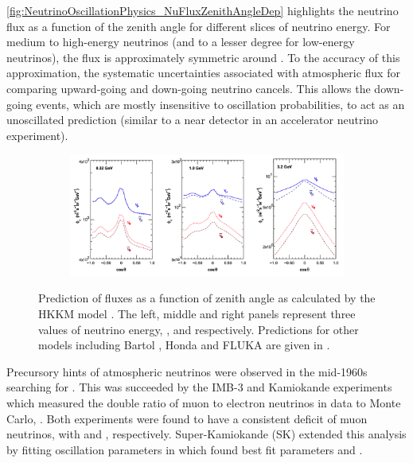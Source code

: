 \autoref{fig:NeutrinoOscillationPhysics_NuFluxZenithAngleDep} highlights the neutrino flux as a function of the zenith angle for different slices of neutrino energy. For medium to high-energy neutrinos (and to a lesser degree for low-energy neutrinos), the flux is approximately symmetric around . To the accuracy of this approximation, the systematic uncertainties associated with atmospheric flux for comparing upward-going and down-going neutrino cancels. This allows the down-going events, which are mostly insensitive to oscillation probabilities, to act as an unoscillated prediction (similar to a near detector in an accelerator neutrino experiment).

\begin{figure}[h]
  \begin{subfigure}[t]{0.90\textwidth}
    \includegraphics[width=\textwidth, trim={0mm 0mm 0mm 0mm}, clip,page=1]{Figures/Theory/NuFluxZenithAngleDep.pdf}
  \end{subfigure}
  \caption{Prediction of  fluxes as a function of zenith angle as calculated by the HKKM model \cite{Honda:2011}. The left, middle and right panels represent three values of neutrino energy, ,  and  respectively. Predictions for other models including Bartol \cite{Barr_2004}, Honda \cite{Honda_2007} and FLUKA \cite{etde_20239111} are given in \cite{Ashie_2005}.}
  \label{fig:NeutrinoOscillationPhysics_NuFluxZenithAngleDep}
\end{figure}

Precursory hints of atmospheric neutrinos were observed in the mid-1960s searching for  \cite{Reines1965-cf}.
This was succeeded by the IMB-3 \cite{PhysRevLett.66.2561} and Kamiokande \cite{Hirata1992-qz} experiments which measured the double ratio of muon to electron neutrinos in data to Monte Carlo, . Both experiments were found to have a consistent deficit of muon neutrinos, with  and , respectively. %
Super-Kamiokande (SK) \cite{Ashie_2005} extended this analysis by fitting oscillation parameters in  which found best fit parameters  and .

